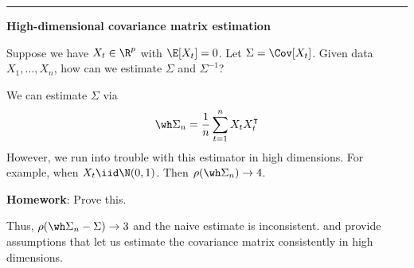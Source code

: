 \begin{center}\rule{0.5\linewidth}{0.5pt}\end{center}

\textbf{High-dimensional covariance matrix estimation}

Suppose we have \(X_t \in \R^p\) with \(\E[X_t] = 0\). Let \(\Sigma = \Cov[X_t]\). Given data \(X_1, \dots, X_n\), how can we estimate \(\Sigma\) and \(\Sigma^{-1}\)?

We can estimate \(\Sigma\) via
\[\wh \Sigma_n = \frac{1}{n}\sum_{t=1}^n X_t X_t^\intercal\]
However, we run into trouble with this estimator in high dimensions. For example, when \(X_t \iid \N(0, 1)\). Then \(\rho(\wh \Sigma_n) \to 4\).

\textbf{Homework}: Prove this.

Thus, \(\rho(\wh \Sigma_n - \Sigma) \to 3\) and the naive estimate is inconsistent. \citet{WP03} and \citet{BL08a} provide assumptions that let us estimate the covariance matrix consistently in high dimensions.
